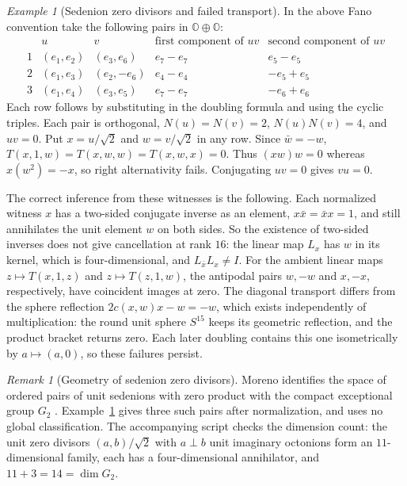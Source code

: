 \documentclass[11pt,reqno]{amsart}
\theoremstyle{definition}
\theoremstyle{remark}
\newtheorem{remark}[theorem]{Remark}
\newtheorem{example}[theorem]{Example}
\numberwithin{equation}{section}
\begin{document}
\begin{example}[Sedenion zero divisors and failed transport]\label{m10:zero}
In the above Fano convention take the following pairs in
\(\mathbb O\oplus\mathbb O\):
\[
\begin{array}{c|cc|cc}
 &u&v&\text{first component of }uv&\text{second component of }uv\\ \hline
1&(e_1,e_2)&(e_3,e_6)&e_7-e_7&e_5-e_5\\
2&(e_1,e_3)&(e_2,-e_6)&e_4-e_4&-e_5+e_5\\
3&(e_1,e_4)&(e_3,e_5)&e_7-e_7&-e_6+e_6
\end{array}
\]
Each row follows by substituting in the doubling formula and using
the cyclic triples. Each pair is orthogonal, \(N(u)=N(v)=2\),
\(N(u)N(v)=4\), and \(uv=0\).
Put \(x=u/\sqrt2\) and \(w=v/\sqrt2\) in any row. Since
\(\bar w=-w\), \(T(x,1,w)=T(x,w,w)=T(x,w,x)=0\).
Thus \((xw)w=0\) whereas \(x(w^2)=-x\), so right alternativity fails.
Conjugating \(uv=0\) gives \(vu=0\).

The correct inference from these witnesses is the following. Each
normalized witness \(x\) has a two-sided conjugate inverse as an
element, \(x\bar x=\bar x x=1\), and still annihilates the unit
element \(w\) on both sides. So the existence of two-sided inverses
does not give cancellation at rank \(16\): the linear map \(L_x\) has
\(w\) in its kernel, which is four-dimensional, and
\(L_{\bar x}L_x\ne I\).
For the ambient linear maps \(z\mapsto T(x,1,z)\) and
\(z\mapsto T(z,1,w)\), the antipodal pairs \(w,-w\) and
\(x,-x\), respectively, have coincident images at zero.
The diagonal transport differs from the sphere reflection
\(2c(x,w)x-w=-w\), which exists independently of multiplication: the
round unit sphere \(S^{15}\) keeps its geometric reflection, and the
product bracket returns zero.
Each later doubling contains this one isometrically by \(a\mapsto(a,0)\),
so these failures persist.
\end{example}

\begin{remark}[Geometry of sedenion zero divisors]\label{m10:moreno}
Moreno identifies the space of ordered pairs of unit sedenions
with zero product with the compact exceptional group \(G_2\)
\cite{m10:Moreno}. Example~\ref{m10:zero} gives three such pairs
after normalization, and uses no global classification. The
accompanying script checks the dimension count: the unit zero divisors
\((a,b)/\sqrt2\) with \(a\perp b\) unit imaginary octonions form an
\(11\)-dimensional family, each has a four-dimensional annihilator,
and \(11+3=14=\dim G_2\).
\end{remark}
\end{document}

